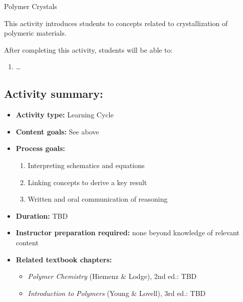 %
%
%
%

\renewcommand{\figpath}{content/polymphys/thermal-transitions/crystals/figs}
\renewcommand{\labelbase}{crystals}

\begin{activity}{Polymer Crystals}

\begin{instructornotes}
	This activity introduces students to concepts related to crystallization of polymeric materials.
	
	After completing this activity, students will be able to:
	\begin{enumerate}
		\item \dots
	\end{enumerate}
	
	\subsection*{Activity summary:}
	\begin{itemize}
		\item \textbf{Activity type:} Learning Cycle
		\item \textbf{Content goals:} See above %
		\item \textbf{Process goals:} %
			\begin{enumerate}
				\item Interpreting schematics and equations
				\item Linking concepts to derive a key result
				\item Written and oral communication of reasoning
			\end{enumerate}
		\item \textbf{Duration:} TBD
		\item \textbf{Instructor preparation required:} none beyond knowledge of relevant content
		\item \textbf{Related textbook chapters:}
			\begin{itemize}
				\item \emph{Polymer Chemistry} (Hiemenz \& Lodge), 2nd ed.: TBD
				\item \emph{Introduction to Polymers} (Young \& Lovell), 3rd ed.: TBD
			\end{itemize}
	\end{itemize}
	

\end{instructornotes}
\end{activity}
